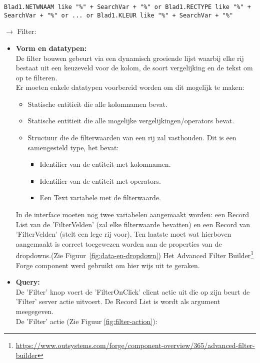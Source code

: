 \begin{lstlisting}
Blad1.NETWNAAM like "%" + SearchVar + "%" or Blad1.RECTYPE like "%" + SearchVar + "%" or ... or Blad1.KLEUR like "%" + SearchVar + "%"
\end{lstlisting}

$\rightarrow$ Filter:
\begin{itemize}
    \item \textbf{Vorm en datatypen:}\\
    De filter bouwen gebeurt via een dynamisch groeiende lijst waarbij elke rij bestaat uit een keuzeveld voor de kolom, de soort vergelijking en de tekst om op te filteren.\\
    Er moeten enkele datatypen voorbereid worden om dit mogelijk te maken:
    \begin{itemize}
        \item Statische entitieit die alle kolomnamen bevat.
        \item Statische entitieit die alle mogelijke vergelijkingen/operators bevat.
        \item Structuur die de filterwaarden van een rij zal vasthouden. Dit is een samengesteld type, het bevat:
        \begin{itemize}
            \item Identifier van de entiteit met kolomnamen.
            \item Identifier van de entiteit met operators.
            \item Een Text variabele met de filterwaarde.
        \end{itemize}
    \end{itemize}
    In de interface moeten nog twee variabelen aangemaakt worden: een Record List van de 'FilterVelden' (zal elke filterwaarde bevatten) en een Record van 'FilterVelden' (stelt een lege rij voor). Ten laatste moet wat hierboven aangemaakt is correct toegewezen worden aan de properties van de dropdowns.(Zie Figuur~\ref{fig:data-en-dropdown})
    Het Advanced Filter Builder\footnote{\url{https://www.outsystems.com/forge/component-overview/365/advanced-filter-builder}} Forge component werd gebruikt om hier wijs uit te geraken.\\
    \item \textbf{Query:}\\
    De 'Filter' knop voert de 'FilterOnClick' client actie uit die op zijn beurt de 'Filter' server actie uitvoert. De Record List is wordt als argument meegegeven.\\
    De 'Filter' actie (Zie Figuur \ref{fig:filter-action}):

\end{itemize}
